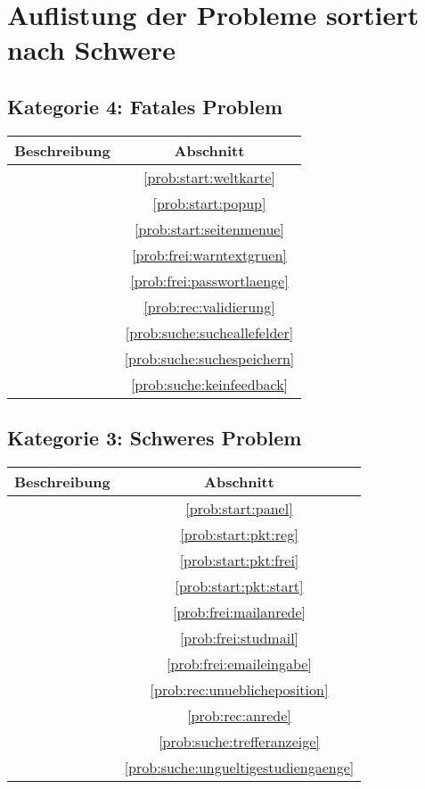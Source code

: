 \section{Auflistung der Probleme sortiert nach Schwere}

\subsection*{Kategorie 4: Fatales Problem}
\begin{tabular}{|p{12cm}|c|}
\hline
\textbf{Beschreibung} & \textbf{Abschnitt} \\
\hline\hline
\nameref{prob:start:weltkarte} & \ref{prob:start:weltkarte} \\ 
\nameref{prob:start:popup} & \ref{prob:start:popup}\\
\nameref{prob:start:seitenmenue} & \ref{prob:start:seitenmenue}\\
\nameref{prob:frei:warntextgruen} & \ref{prob:frei:warntextgruen}\\
\nameref{prob:frei:passwortlaenge} & \ref{prob:frei:passwortlaenge}\\
\nameref{prob:rec:validierung} & \ref{prob:rec:validierung}\\
\nameref{prob:suche:sucheallefelder} & \ref{prob:suche:sucheallefelder}\\
\nameref{prob:suche:suchespeichern} & \ref{prob:suche:suchespeichern}\\
\nameref{prob:suche:keinfeedback} & \ref{prob:suche:keinfeedback}\\
\hline
\end{tabular}

\subsection*{Kategorie 3: Schweres Problem}
\begin{tabular}{|p{12cm}|c|}
\hline
\textbf{Beschreibung} & \textbf{Abschnitt} \\
\hline\hline
\nameref{prob:start:panel} & \ref{prob:start:panel} \\
\nameref{prob:start:pkt:reg} & \ref{prob:start:pkt:reg}\\
\nameref{prob:start:pkt:frei} & \ref{prob:start:pkt:frei}\\
\nameref{prob:start:pkt:start} & \ref{prob:start:pkt:start}\\
\nameref{prob:frei:mailanrede} & \ref{prob:frei:mailanrede}\\
\nameref{prob:frei:studmail} & \ref{prob:frei:studmail}\\
\nameref{prob:frei:emaileingabe} & \ref{prob:frei:emaileingabe}\\
\nameref{prob:rec:unueblicheposition} & \ref{prob:rec:unueblicheposition}\\
\nameref{prob:rec:anrede} & \ref{prob:rec:anrede}\\
\nameref{prob:suche:trefferanzeige} & \ref{prob:suche:trefferanzeige}\\
\nameref{prob:suche:ungueltigestudiengaenge} & \ref{prob:suche:ungueltigestudiengaenge}\\
\hline

\end{tabular}


